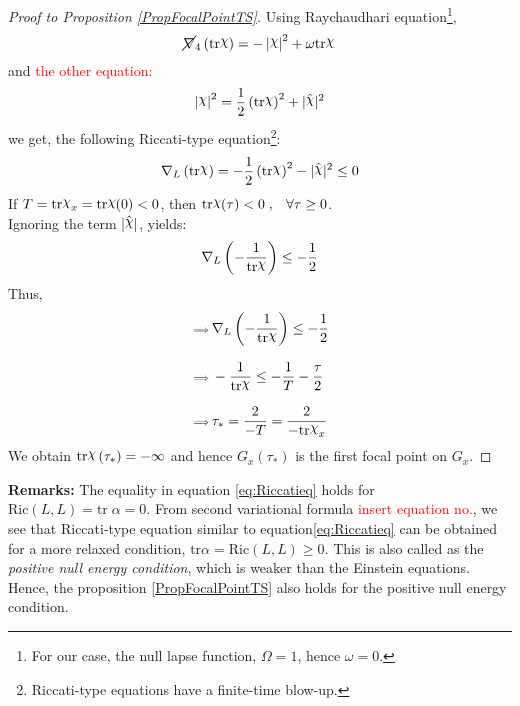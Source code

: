 \documentclass[12pt, a4paper]{report}
\theoremstyle{bfnote}
\newcommand{\chits}{\raisebox{0.5ex}{$\chi$}} %
\begin{document}
\begin{proof}[Proof to Proposition \ref{PropFocalPointTS}]
    Using Raychaudhari equation\footnote[5]{\hspace{0.3em}For our case, the null lapse function, $\Omega = 1$, hence $\omega = 0$.},
    \begin{equation*}
        \cancel{\nabla}_4\left(\mathrm{tr}\chits\right) = -\left|{\chits}\right|^2 + \omega\mathrm{tr}\chits
    \end{equation*}
    and \textcolor{red}{the other equation:}
    \begin{equation*}
        \left|\chits\right|^2 = \frac{1}{2}\left(\mathrm{tr}\chits\right)^2 + |\hat{\chits}|^2
    \end{equation*}
    we get, the following Riccati-type equation\footnote[4]{\hspace{0.3em}Riccati-type equations have a finite-time blow-up.}:
    \begin{equation}{\label{eq:Riccatieq}}
        \nabla_L\left(\mathrm{tr}\chits\right) = -\frac{1}{2}\left(\mathrm{tr}\chits\right)^2 - |\hat{\chits}|^2 \leq 0
    \end{equation}
    If $T = \mathrm{tr}\chits_x = \mathrm{tr}\chits\hspace{-0.2em}\left(0\right) < 0$, then
    $\mathrm{tr}\chits\hspace{-0.2em}\left(\tau\right) < 0\;, \hspace{0.8em} \forall \tau \geq 0$. \\
    Ignoring the term $|\hat{\chits}|$, yields:
    \begin{equation*}
        \nabla_L\left(-\frac{1}{\mathrm{tr}\chits}\right) \leq -\frac{1}{2}
    \end{equation*}
    Thus,
    \begin{align*}
        \scalebox{0.7}{$\implies$} & \nabla_L\left(-\frac{1}{\mathrm{tr}\chits}\right) \leq -\frac{1}{2}\\[0.8em]
        \scalebox{0.7}{$\implies$} & -\frac{1}{\mathrm{tr}\chits} \leq -\frac{1}{T} - \frac{\tau}{2}\\[0.8em]
        \scalebox{0.7}{$\implies$} & \tau_* = \frac{2}{-T} = \frac{2}{-\mathrm{tr}\chits_x}
    \end{align*}
    We obtain $\mathrm{tr}\chits\left(\tau_*\right) = -\infty$ and hence $G_x\left(\tau_*\right)$ is the first focal point on $G_x$.
\end{proof}
{\bfseries{Remarks:}} The equality in equation \eqref{eq:Riccatieq} holds for
$\mathrm{Ric}\left(L, L\right) = \mathrm{tr}\;\alpha = 0$. From second
variational formula \textcolor{red}{insert equation no.}, we see that
Riccati-type equation similar to equation\ref{eq:Riccatieq} can be obtained for
a more relaxed condition, $\mathrm{tr}\alpha = \mathrm{Ric}\left(L, L\right)\geq
0$. This is also called as the \textit{positive null energy condition}, which is
weaker than the Einstein equations. Hence, the proposition
\ref{PropFocalPointTS} also holds for the positive null energy condition.
\end{document}

